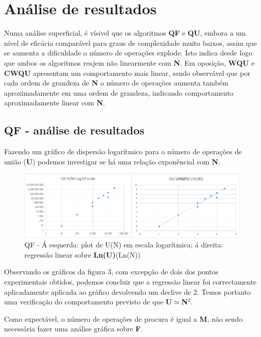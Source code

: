 \documentclass[10pt,a4paper]{article}
\begin{document}

\section{Análise de resultados}
\par Numa análise superficial, é vísivel que os algoritmos \textbf{QF} e \textbf{QU}, embora a um nível de eficácia comparável para graus de complexidade muito baixos, assim que se aumenta a dificuldade o número de operações explode. Isto indica desde logo que ambos os algoritmos reajem não linearmente com \textbf{N}. Em oposição, \textbf{WQU} e \textbf{CWQU} apresentam um comportamento mais linear, sendo observável que por cada ordem de grandeza de \textbf{N} o número de operações aumenta também aproximadamente em uma ordem de grandeza, indicando comportamento aproximadamente linear com \textbf{N}.
\subsection{QF - análise de resultados}
\par Fazendo um gráfico de dispersão logarítmico para o número de operações de união (\textbf{U}) podemos investigar se há uma relação exponêncial com \textbf{N}.

\begin{figure}[h!]
\includegraphics[scale=0.35]{QUgraphs.png}
\caption{QF - Á esquerda: plot de U(N) em escala logarítmica; á direita: regressão linear sobre \textbf{Ln(U)}(Ln(N)) }
\end{figure}
\par Observando os gráficos da figura 3, com excepção de dois dos pontos experimentais obtidos, podemos concluir que a regressão linear foi correctamente aplicadamente aplicada ao gráfico devolvendo um declive de 2. Temos portanto uma verificação do comportamento previsto de que \textbf{U$\simeq$N}$^2$.
\par Como expectável, o número de operações de procura é igual a \textbf{M}, não sendo necessária fazer uma análise gráfica sobre \textbf{F}.
\end{document}

